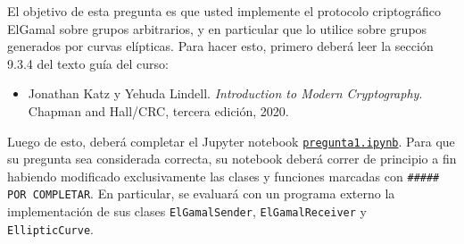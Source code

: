 
El objetivo de esta pregunta es que usted implemente el protocolo criptográfico ElGamal sobre grupos arbitrarios, y en particular que lo utilice sobre grupos generados por curvas elípticas. Para hacer esto, primero deberá leer la sección 9.3.4 del texto guía del curso:

\begin{itemize}
  \item Jonathan Katz y Yehuda Lindell. {\em Introduction to Modern Cryptography}. Chapman and Hall/CRC, tercera edición, 2020.
\end{itemize}

Luego de esto, deberá completar el Jupyter notebook \href{https://github.com/UC-IIC3253/2022/tree/main/Tareas/Tarea\%203/pregunta1.ipynb}{\texttt{pregunta1.ipynb}}. Para que su pregunta sea considerada correcta, su notebook deberá correr de principio a fin habiendo modificado exclusivamente las clases y funciones marcadas con \texttt{\#\#\#\#\# POR COMPLETAR}. En particular, se evaluará con un programa externo la implementación de sus clases \texttt{ElGamalSender}, \texttt{ElGamalReceiver} y \texttt{EllipticCurve}.
